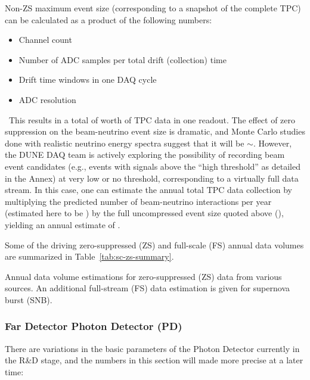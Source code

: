 Non-ZS maximum event size (corresponding to a snapshot of the complete TPC) can be calculated as a product of the following numbers:
\begin{itemize}
\item Channel count
\item Number of ADC samples per total drift (collection) time
\item Drift time windows in one DAQ cycle
\item ADC resolution
\end{itemize}
\
This results in a total of \dunefsreadoutsize worth of TPC data in one
readout.
The effect of zero suppression on
the beam-neutrino event size is dramatic, and Monte Carlo studies done with realistic neutrino
energy spectra suggest that it will be $\sim$\beameventsize.
However, %
the DUNE DAQ team is actively exploring the possibility of
recording beam event candidates (e.g., events with signals
above the ``high threshold'' as detailed in the Annex) at very low or no threshold, corresponding
to a virtually full data stream.
In this case, one can estimate the annual total %
TPC data collection
by multiplying the predicted number of beam-neutrino interactions
per year (estimated here to be \beamrate) by the full uncompressed event size quoted above (\dunefsreadoutsize), yielding
an annual estimate of \beamdatayearfs. %

Some of the driving zero-suppressed (ZS) and full-scale (FS) annual
data volumes are summarized in Table~\ref{tab:sc-zs-summary}.
\begin{table}[htbp]
  \centering
  \caption[Annual data volume estimations for zero-suppressed (ZS) data from various sources]{Annual data volume estimations for zero-suppressed (ZS) data from various sources.
  An additional full-stream (FS) data estimation is given for supernova burst (SNB).}
  
  \label{tab:sc-zs-summary}
\end{table}

\subsubsection{Far Detector Photon Detector (PD)}
There are variations in the basic parameters of the Photon Detector currently in the R\&D stage, %
and the numbers in this section %
will made more precise
at a later time:

